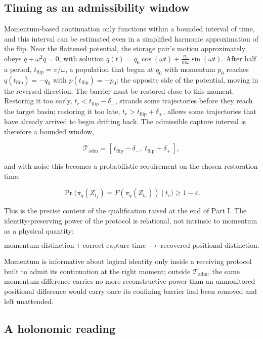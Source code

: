 \documentclass[11pt]{article}
\begin{document}
\subsection{Timing as an admissibility window}

Momentum-based continuation only functions within a bounded interval of time, and this interval can be estimated even in a simplified harmonic approximation of the flip. Near the flattened potential, the storage pair's motion approximately obeys $\ddot q + \omega^2 q = 0$, with solution $q(t) = q_0\cos(\omega t) + \frac{p_0}{m\omega}\sin(\omega t)$. After half a period, $t_{\mathrm{flip}}=\pi/\omega$, a population that began at $q_0$ with momentum $p_0$ reaches $q(t_{\mathrm{flip}})=-q_0$ with $p(t_{\mathrm{flip}})=-p_0$: the opposite side of the potential, moving in the reversed direction. The barrier must be restored close to this moment. Restoring it too early, $t_r < t_{\mathrm{flip}}-\delta_-$, strands some trajectories before they reach the target basin; restoring it too late, $t_r > t_{\mathrm{flip}}+\delta_+$, allows some trajectories that have already arrived to begin drifting back. The admissible capture interval is therefore a bounded window,

\[
\mathcal T_{\mathrm{adm}} = [\,t_{\mathrm{flip}}-\delta_-,\; t_{\mathrm{flip}}+\delta_+\,],
\]

and with noise this becomes a probabilistic requirement on the chosen restoration time,

\[
\Pr\bigl(\pi_q(Z_{t_f}) = F(\pi_q(Z_{t_0})) \mid t_r\bigr) \ge 1-\varepsilon.
\]

This is the precise content of the qualification raised at the end of Part I. The identity-preserving power of the protocol is relational, not intrinsic to momentum as a physical quantity:

\[
\text{momentum distinction} + \text{correct capture time} \;\longrightarrow\; \text{recovered positional distinction}.
\]

Momentum is informative about logical identity only inside a receiving protocol built to admit its continuation at the right moment; outside $\mathcal T_{\mathrm{adm}}$, the same momentum difference carries no more reconstructive power than an unmonitored positional difference would carry once its confining barrier had been removed and left unattended.

\subsection{A holonomic reading}
\end{document}
